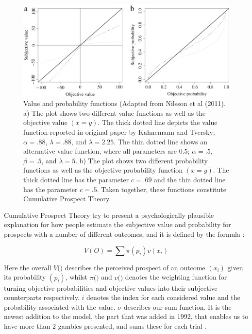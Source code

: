 \documentclass{article}
\begin{document}
    \begin{figure}[H]
        \begin{centering}
        \includegraphics[width = \textwidth]{figures/Billede 2.jpg}
        \caption{Value and probability functions (Adapted from Nilsson et al (2011). a) The plot shows two different value functions as well as the objective value $(x = y)$. The thick dotted line depicts the value function reported in original paper by Kahnemann and Tversky; $\alpha=.88$, $\lambda=.88$, and $\lambda=2.25$. The thin dotted line shows an alternative value function, where all parameters are 0.5; $\alpha=.5$, $\beta=.5$, and $\lambda=5$. b) The plot shows two different probability functions as well as the objective probability function $(x = y)$. The thick dotted line has the parameter $c=.69$ and the thin dotted line has the parameter $c=.5$. Taken together, these functions constitute Cumulative Prospect Theory. }
        \end{centering}
    \end{figure}

    Cumulative Prospect Theory try to present a psychologically plausible explanation for how people estimate the subjective value and probability for prospects with a number of different outcomes, and it is defined by the formula \cite{nilsson2011jomp}:

    $$V(O) = \sum \pi (p_i)v(x_i) $$

    Here the overall $V(\dot)$ describes the perceived prospect of an outcome $(x_i)$ given its probability $(p_i)$, whilst $\pi(\dot)$ and $v(\dot)$ denotes the weighting function for turning objective probabilities and objective values into their subjective counterparts respectively. $i$ denotes the index for each considered value and the probability associated with the value. $\sigma$ describes our sum function. It is the newest addition to the model, the part that was added in 1992, that enables us to have more than 2 gambles presented, and sums these for each trial \cite{tversky1992advances,fennema1997original}.
\end{document}
